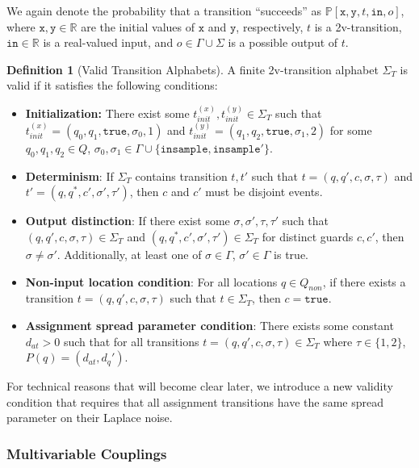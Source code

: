 \documentclass[12pt]{article}
\newcommand{\RR}{\mathbb{R}}
\newcommand{\PP}{\mathbb{P}}
\theoremstyle{definition}
\newtheorem{defn}[thm]{Definition}
\begin{document}
We again denote the probability that a transition ``succeeds'' as $\PP[\texttt{x}, \texttt{y}, t, \texttt{in}, o]$, where $\texttt{x}, \texttt{y}\in \RR$ are the initial values of $\texttt{x}$ and $\texttt{y}$, respectively, $t$ is a 2v-transition, $\texttt{in}\in \RR$ is a real-valued input, and $o\in \Gamma\cup\Sigma$ is a possible output of $t$.

\begin{defn}[Valid Transition Alphabets]
    A finite 2v-transition alphabet $\Sigma_T$ is valid if it satisfies the following conditions: 
    \begin{itemize}
        \item \textbf{Initialization:} There exist some $t_{init}^{(x)}, t_{init}^{(y)}\in \Sigma_T$ such that $t_{init}^{(x)} = (q_0, q_1, \texttt{true}, \sigma_0, 1)$ and $t_{init}^{(y)} = (q_1, q_2, \texttt{true}, \sigma_1, 2)$ for some $q_0, q_1, q_2\in Q$, $\sigma_0, \sigma_1 \in \Gamma\cup\{\texttt{insample}, \texttt{insample}'\}$. 
        \item \textbf{Determinism}: If $\Sigma_T$ contains transition $t, t'$ such that $t=(q, q', c, \sigma, \tau)$ and $t'= (q, q^*, c', \sigma', \tau')$, then $c$ and $c'$ must be disjoint events. 
        \item \textbf{Output distinction}: If there exist some $\sigma, \sigma', \tau, \tau'$ such that $(q, q', c, \sigma, \tau)\in \Sigma_T$  and $(q, q^*, c', \sigma', \tau') \in \Sigma_T$ for distinct guards $c, c'$, then $\sigma \neq \sigma'$. Additionally, at least one of $\sigma\in \Gamma$, $\sigma'\in \Gamma$ is true.
        \item \textbf{Non-input location condition}: For all locations $q\in Q_{non}$, if there exists a transition $t=(q, q', c, \sigma, \tau)$ such that $t\in \Sigma_T$, then $c = \texttt{true}$.
        \item \textbf{Assignment spread parameter condition}: There exists some constant $d_{at}>0$ such that for all transitions $t = (q, q', c, \sigma, \tau)\in \Sigma_T$ where $\tau \in \{1, 2\}$, $P(q) = (d_{at}, d_q')$.
    \end{itemize}
\end{defn}

For technical reasons that will become clear later, we introduce a new validity condition that requires that all assignment transitions have the same spread parameter on their Laplace noise.

\subsubsection{Multivariable Couplings}
\end{document}
